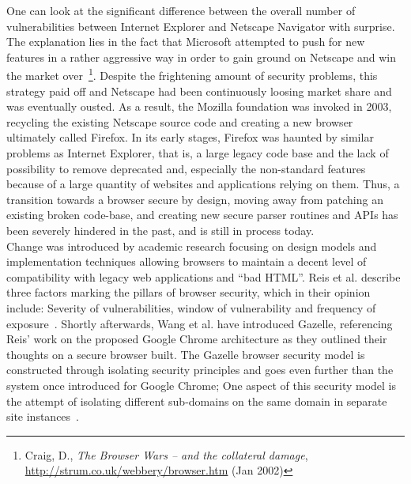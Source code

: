     One can look at the significant difference between the overall number of vulnerabilities between Internet Explorer and Netscape Navigator with surprise. The explanation lies in the fact that Microsoft attempted to push for new features in a rather aggressive way in order to gain ground on Netscape and win the market over~\footnote{Craig, D., \textit{The Browser Wars -- and the collateral damage}, \url{http://strum.co.uk/webbery/browser.htm} (Jan 2002)}. Despite the frightening amount of security problems, this strategy paid off and Netscape had been continuously loosing market share and was eventually ousted. As a result, the Mozilla foundation was invoked in 2003, recycling the existing Netscape source code and creating a new browser ultimately called Firefox. In its early stages, Firefox was haunted by similar problems as Internet Explorer, that is, a large legacy code base and the lack of possibility to remove deprecated and, especially the non-standard features because of a large quantity of websites 
and applications relying on them. Thus, a transition towards a browser secure by design, moving away from patching an existing broken code-base, and creating new secure parser routines and APIs has been severely hindered in the past, and is still in process today.\\

    Change was introduced by academic research focusing on design models and implementation techniques allowing browsers to maintain a decent level of compatibility with legacy web applications and ``bad HTML''. Reis et al. describe three factors marking the pillars of browser security, which in their opinion include: Severity of vulnerabilities, window of vulnerability and frequency of exposure~\cite{reis2009browser}. Shortly afterwards, Wang et al. have introduced Gazelle, referencing Reis' work on the proposed Google Chrome architecture as they outlined their thoughts on a secure browser built. The Gazelle browser security model is constructed through isolating security principles and goes even further than the system once introduced for Google Chrome; One aspect of this security model is the attempt of isolating different sub-domains on the same domain in separate site instances~\cite{wang2009multi}.\\ 

